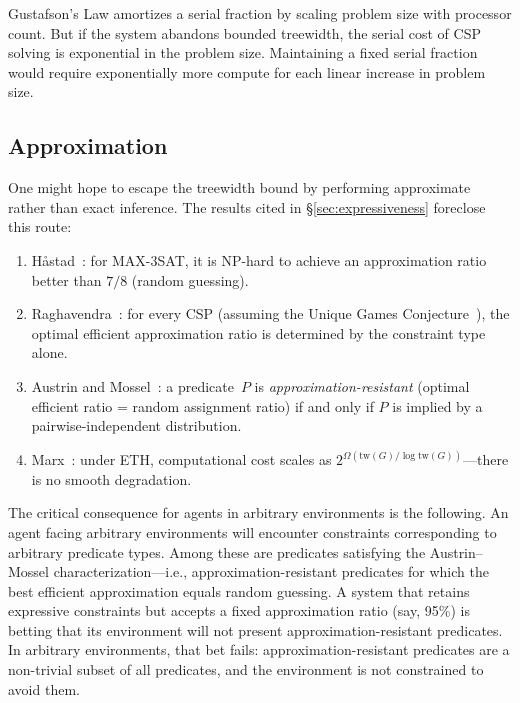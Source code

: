 \documentclass[runningheads]{llncs}
\begin{document}
\begin{remark}\label{rem:gustafson}
Gustafson's Law amortizes a serial fraction by scaling problem size with processor count.
But if the system abandons bounded treewidth, the serial cost of CSP solving is exponential in the problem size.
Maintaining a fixed serial fraction would require exponentially more compute for each linear increase in problem size.
\end{remark}

\subsection{Approximation}\label{sec:approx}

\begin{remark}\label{rem:inapprox}
One might hope to escape the treewidth bound by performing approximate rather than exact inference.
The results cited in \S\ref{sec:expressiveness} foreclose this route:
\begin{enumerate}[nosep,label=(\roman*)]
  \item H\aa stad~\cite{Hastad01}: for MAX-3SAT, it is NP-hard to achieve an approximation ratio better than $7/8$ (random guessing).
  \item Raghavendra~\cite{Raghavendra08}: for every CSP (assuming the Unique Games Conjecture~\cite{Khot02}), the optimal efficient approximation ratio is determined by the constraint type alone.
  \item Austrin and Mossel~\cite{AustrinMossel09}: a predicate~$P$ is \emph{approximation-resistant} (optimal efficient ratio = random assignment ratio) if and only if $P$ is implied by a pairwise-independent distribution.
  \item Marx~\cite{Marx10}: under ETH, computational cost scales as $2^{\Omega(\mathrm{tw}(G)/\log \mathrm{tw}(G))}$---there is no smooth degradation.
\end{enumerate}
The critical consequence for agents in arbitrary environments is the following.
An agent facing arbitrary environments will encounter constraints corresponding to arbitrary predicate types.
Among these are predicates satisfying the Austrin--Mossel characterization---i.e., approximation-resistant predicates for which the best efficient approximation equals random guessing.
A system that retains expressive constraints but accepts a fixed approximation ratio (say, 95\%) is betting that its environment will not present approximation-resistant predicates.
In arbitrary environments, that bet fails: approximation-resistant predicates are a non-trivial subset of all predicates, and the environment is not constrained to avoid them.


\end{remark}
\end{document}

